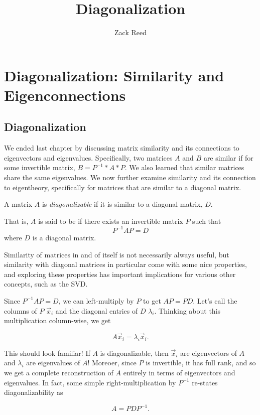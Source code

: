 \documentclass{ximera}
\author{Zack Reed}
\title{Diagonalization}
\begin{document}
\begin{abstract}

\end{abstract}
\maketitle

\section*{Diagonalization: Similarity and Eigenconnections}

\subsection*{Diagonalization}

We ended last chapter by discussing matrix similarity and its connections to eigenvectors and eigenvalues. Specifically, two matrices $A$ and $B$ are similar if for some invertible matrix, $B=P^{-1}*A*P$. We also learned that similar matrices share the same eigenvalues. We now further examine similarity and its connection to eigentheory, specifically for matrices that are similar to a diagonal matrix. 

\begin{definition}
  A matrix $A$ is \emph{diagonalizable} if it is similar to a diagonal matrix, $D$. 

  That is, $A$ is said to be  if there exists an invertible matrix $P$ such that
\begin{equation*}
P^{-1}AP=D
\end{equation*}
where $D$ is a diagonal matrix.
\end{definition}

Similarity of matrices in and of itself is not necessarily always useful, but similarity with diagonal matrices in particular come with some nice properties, and exploring these properties has important implications for various other concepts, such as the SVD.

\begin{exploration}

    Since $P^{-1}AP=D$, we can left-multiply by $P$ to get $AP=PD$. Let's call the columns of $P$ $\vec{x}_i$ and the diagonal entries of $D$ $\lambda_i$. Thinking about this multiplication column-wise, we get

    $$A\vec{x}_i=\lambda_i\vec{x}_i.$$

    This should look familiar! If $A$ is diagonalizable, then $\vec{x}_i$ are eigenvectors of $A$ and $\lambda_i$ are eigenvalues of $A$! Moreoer, since $P$ is invertible, it has full rank, and so we get a complete reconstruction of $A$ entirely in terms of eigenvectors and eigenvalues. In fact, some simple right-multiplication by $P^{-1}$ re-states diagonalizability as

    $$A=PDP^{-1}.$$


\end{exploration}
\end{document}
